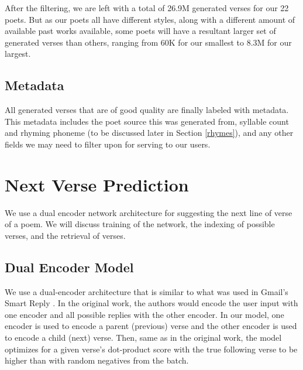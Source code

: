 \documentclass[11pt]{article}
\begin{document}



After the filtering, we are left with a total of 26.9M generated verses for our 22 poets.
But as our poets all have different styles, along with a different amount of available past works available, some poets will have a resultant larger set of generated verses than others, ranging from 60K for our smallest to  8.3M for our largest.


\subsection{Metadata}\label{metadata}

All generated verses that are of good quality are finally labeled with metadata.
This metadata includes the poet source this was generated from, syllable count and rhyming phoneme (to be discussed later in Section \ref{rhymes}), and any other fields we may need to filter upon for serving to our users.

\section{Next Verse Prediction}\label{prediction}

We use a dual encoder network architecture for suggesting the next line of verse of a poem.
We will discuss training of the network, the indexing of possible verses, and the retrieval of verses.

\subsection{Dual Encoder Model}

We use a dual-encoder architecture that is similar to what was used in Gmail's Smart Reply \cite{henderson2017}.
In the original work, the authors would encode the user input with one encoder and all possible replies with the other encoder.
In our model, one encoder is used to encode a parent (previous) verse and the other encoder is used to encode a child (next) verse.
Then, same as in the original work, the model optimizes for a given verse’s dot-product score with the true following verse to be higher than with random negatives from the batch.
\end{document}

